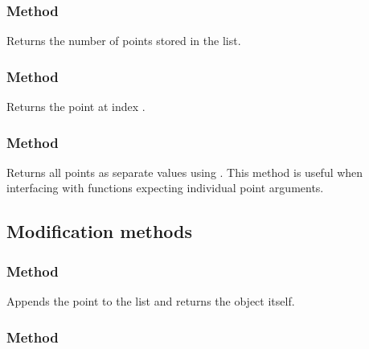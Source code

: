 \subsubsection{Method }
\label{ssub:meth_list_point_len}

Returns the number of points stored in the list.

\subsubsection{Method }
\label{ssub:meth_list_point_get}

Returns the point at index .

\subsubsection{Method }
\label{ssub:meth_list_point_unpack}

Returns all points as separate values using .
This method is useful when interfacing with functions expecting individual point arguments.

\begin{tkzexample}[latex=.5\textwidth]
\begin{center}
\end{center}
\end{tkzexample}

\subsection{Modification methods}
\label{subsec:list_point_mutators}

\subsubsection{Method }
\label{ssub:meth_list_point_add}

Appends the point  to the list and returns the object itself.

\subsubsection{Method }
\label{ssub:meth_list_point_extend}

